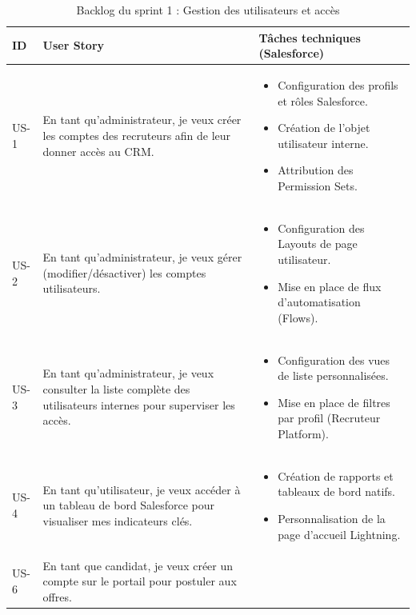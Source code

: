 \begin{table}[H]
\caption{Backlog du sprint 1 : Gestion des utilisateurs et accès}
    \centering
    \begin{tabular}{|p{1cm}|p{8cm}|p{8cm}|}
    \hline
    \textbf{ID} & \textbf{User Story} & \textbf{Tâches techniques (Salesforce)} \\
    \hline
    US-1 & En tant qu'administrateur, je veux créer les comptes des recruteurs afin de leur donner accès au CRM.
    & 
    \begin{itemize}[leftmargin=*]
    \item Configuration des profils et rôles Salesforce.
    \item Création de l'objet utilisateur interne.
    \item Attribution des Permission Sets.
    \end{itemize} \\
    \hline
    US-2 & En tant qu'administrateur, je veux gérer (modifier/désactiver) les comptes utilisateurs. & 
    \begin{itemize}[leftmargin=*]
    \item Configuration des Layouts de page utilisateur.
    \item Mise en place de flux d'automatisation (Flows).
    \end{itemize} \\
    \hline
    US-3 & En tant qu'administrateur, je veux consulter la liste complète des utilisateurs internes pour superviser les accès.  & 
    \begin{itemize}[leftmargin=*]
    \item Configuration des vues de liste personnalisées.
    \item Mise en place de filtres par profil (Recruteur Platform).
    \end{itemize} \\
    \hline
    US-4 & En tant qu'utilisateur, je veux accéder à un tableau de bord Salesforce pour visualiser mes indicateurs clés.& 
    \begin{itemize}[leftmargin=*]
    \item Création de rapports et tableaux de bord natifs.
    \item Personnalisation de la page d'accueil Lightning.
    \end{itemize} \\
    \hline
    US-6 & En tant que candidat, je veux créer un compte sur le portail pour postuler aux offres.& 
    \begin{itemize}[leftmargin=*]

\end{itemize}
\end{tabular}
\end{table}

